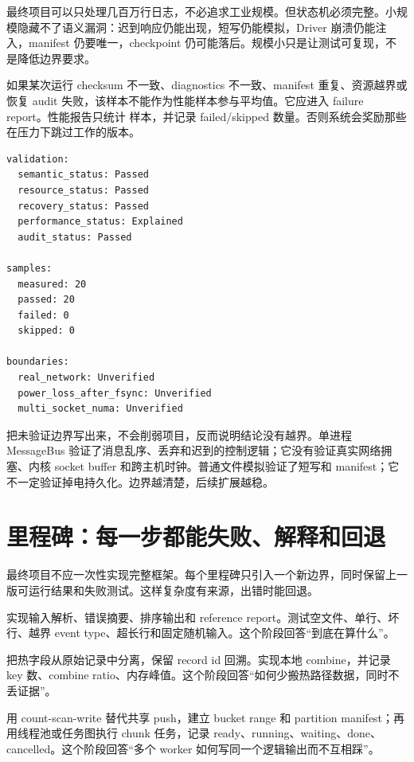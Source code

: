 最终项目可以只处理几百万行日志，不必追求工业规模。但状态机必须完整。小规模隐藏不了语义漏洞：迟到响应仍能出现，短写仍能模拟，Driver 崩溃仍能注入，manifest 仍要唯一，checkpoint 仍可能落后。规模小只是让测试可复现，不是降低边界要求。

如果某次运行 checksum 不一致、diagnostics 不一致、manifest 重复、资源越界或恢复 audit 失败，该样本不能作为性能样本参与平均值。它应进入 failure report。性能报告只统计  样本，并记录 failed/skipped 数量。否则系统会奖励那些在压力下跳过工作的版本。

\begin{lstlisting}[numbers=none,caption={最终验收摘要的机器可读形态}]
validation:
  semantic_status: Passed
  resource_status: Passed
  recovery_status: Passed
  performance_status: Explained
  audit_status: Passed

samples:
  measured: 20
  passed: 20
  failed: 0
  skipped: 0

boundaries:
  real_network: Unverified
  power_loss_after_fsync: Unverified
  multi_socket_numa: Unverified
\end{lstlisting}

把未验证边界写出来，不会削弱项目，反而说明结论没有越界。单进程 MessageBus 验证了消息乱序、丢弃和迟到的控制逻辑；它没有验证真实网络拥塞、内核 socket buffer 和跨主机时钟。普通文件模拟验证了短写和 manifest；它不一定验证掉电持久化。边界越清楚，后续扩展越稳。

\section{里程碑：每一步都能失败、解释和回退}

最终项目不应一次性实现完整框架。每个里程碑只引入一个新边界，同时保留上一版可运行结果和失败测试。这样复杂度有来源，出错时能回退。

实现输入解析、错误摘要、排序输出和 reference report。测试空文件、单行、坏行、越界 event type、超长行和固定随机输入。这个阶段回答“到底在算什么”。

把热字段从原始记录中分离，保留 record id 回溯。实现本地 combine，并记录 key 数、combine ratio、内存峰值。这个阶段回答“如何少搬热路径数据，同时不丢证据”。

用 count-scan-write 替代共享 push，建立 bucket range 和 partition manifest；再用线程池或任务图执行 chunk 任务，记录 ready、running、waiting、done、cancelled。这个阶段回答“多个 worker 如何写同一个逻辑输出而不互相踩”。


